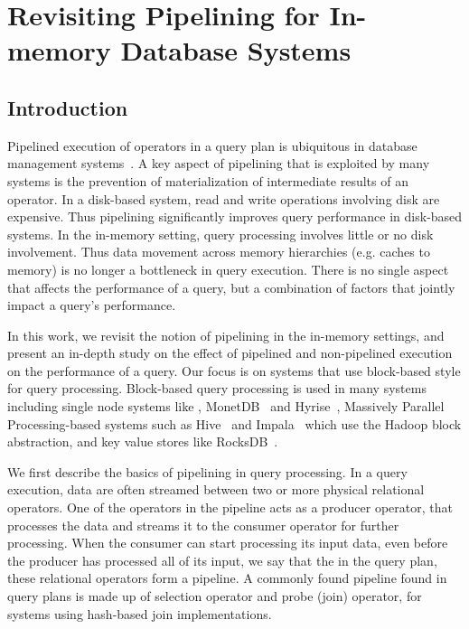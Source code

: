 \chapter{Revisiting Pipelining for In-memory Database Systems}\label{chap:pipeline}
\section{Introduction}

Pipelined execution of operators in a query plan is ubiquitous in database management systems~\cite{quickstep-system, monetdb, hyper, vectorwise, elastic-pipelining}. 
A key aspect of pipelining that is exploited by many systems is the prevention of materialization of intermediate results of an operator.  
In a disk-based system, read and write operations involving disk are expensive.
Thus pipelining significantly improves query performance in disk-based systems. 
In the in-memory setting, query processing involves little or no disk involvement. 
Thus data movement across memory hierarchies (e.g. caches to memory) is no longer a bottleneck in query execution.
There is no single aspect that affects the performance of a query, but a combination of factors that jointly impact a query's performance. 

In this work, we revisit the notion of pipelining in the in-memory settings, and present an in-depth study on the effect of pipelined and non-pipelined execution on the performance of a query. 
Our focus is on systems that use block-based style for query processing.
Block-based query processing is used in many systems including single node systems like \sys{}, MonetDB~\cite{monetdb} and Hyrise~\cite{hyrise-website}, Massively Parallel Processing-based systems such as Hive~\cite{hive} and Impala~\cite{impala} which use the Hadoop block abstraction, and key value stores like RocksDB~\cite{rocksdb}.

We first describe the basics of pipelining in query processing. 
In a query execution, data are often streamed between two or more physical relational operators. 
One of the operators in the pipeline acts as a producer operator, that processes the data and streams it to the consumer operator for further processing. 
When the consumer can start processing its input data, even before the producer has processed all of its input, we say that the in the query plan, these relational operators form a pipeline.
A commonly found pipeline found in query plans is made up of selection operator and probe (join) operator, for systems using hash-based join implementations.

